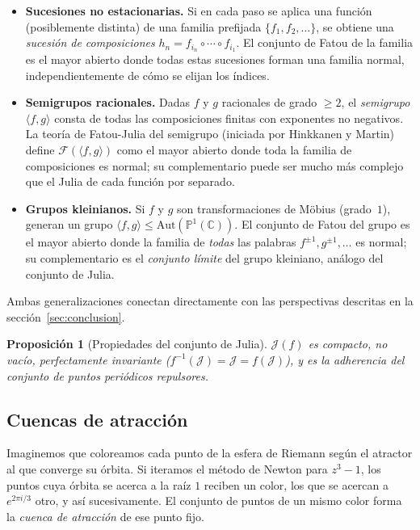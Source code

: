 \documentclass[11pt,a4paper]{article}
\theoremstyle{plain}
\newtheorem{proposicion}[teorema]{Proposición}
\theoremstyle{definition}
\theoremstyle{remark}
\newcommand{\Puno}{\mathbb{P}^1(\mathbb{C})}
\begin{document}
\begin{itemize}
  \item \textbf{Sucesiones no estacionarias.}
        Si en cada paso se aplica una función (posiblemente distinta) de
        una familia prefijada $\{f_1,f_2,\ldots\}$, se obtiene una
        \emph{sucesión de composiciones}
        $h_n = f_{i_n}\circ\cdots\circ f_{i_1}$.
        El conjunto de Fatou de la familia es el mayor abierto donde
        todas estas sucesiones forman una familia normal,
        independientemente de cómo se elijan los índices.
  \item \textbf{Semigrupos racionales.}
        Dadas $f$ y $g$ racionales de grado $\geq 2$, el
        \emph{semigrupo} $\langle f,g\rangle$ consta de todas las
        composiciones finitas con exponentes no negativos.
        La teoría de Fatou-Julia del semigrupo (iniciada por
        Hinkkanen y Martin) define $\mathcal{F}(\langle f,g\rangle)$
        como el mayor abierto donde toda la familia de composiciones
        es normal; su complementario puede ser mucho más complejo
        que el Julia de cada función por separado.
  \item \textbf{Grupos kleinianos.}
        Si $f$ y $g$ son transformaciones de Möbius (grado~$1$),
        generan un grupo $\langle f,g\rangle\leq\mathrm{Aut}(\Puno)$.
        El conjunto de Fatou del grupo es el mayor abierto donde la
        familia de \emph{todas} las palabras $f^{\pm 1},g^{\pm 1},\ldots$
        es normal; su complementario es el \emph{conjunto límite}
        del grupo kleiniano, análogo del conjunto de Julia.
\end{itemize}

Ambas generalizaciones conectan directamente con las perspectivas
descritas en la sección~\ref{sec:conclusion}.

\begin{proposicion}[Propiedades del conjunto de Julia]
$\mathcal{J}(f)$ es compacto, no vacío, perfectamente invariante
($f^{-1}(\mathcal{J})=\mathcal{J}=f(\mathcal{J})$), y es la
adherencia del conjunto de puntos periódicos repulsores.
\end{proposicion}

\subsection{Cuencas de atracción}

Imaginemos que coloreamos cada punto de la esfera de Riemann según el atractor al que
converge su órbita. Si iteramos el método de Newton para $z^3-1$, los puntos cuya órbita
se acerca a la raíz $1$ reciben un color, los que se acercan a $e^{2\pi i/3}$ otro, y así
sucesivamente. El conjunto de puntos de un mismo color forma la \emph{cuenca de atracción}
de ese punto fijo.
\end{document}
